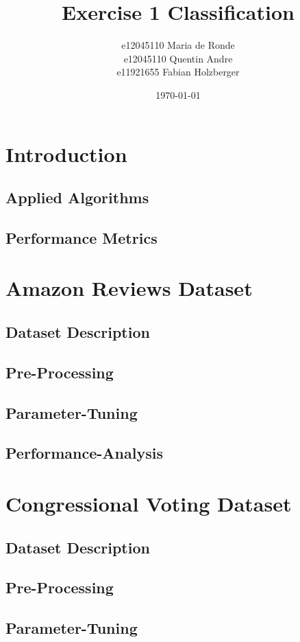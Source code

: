 \documentclass[11pt]{article}
\title{Exercise 1 Classification}
\author{e12045110 Maria de Ronde \\ e12045110  Quentin Andre  \\ e11921655 Fabian Holzberger}
\date{\today}
\begin{document}
\graphicspath{{./figures/}}
\maketitle

%
\section{Introduction}

\subsection{Applied Algorithms}
\subsection{Performance Metrics}

\section{Amazon Reviews Dataset}
\subsection{Dataset Description}
\subsection{Pre-Processing}
\subsection{Parameter-Tuning}
\subsection{Performance-Analysis}

\section{Congressional Voting Dataset}
\subsection{Dataset Description}
\subsection{Pre-Processing}
\subsection{Parameter-Tuning}
\end{document}
